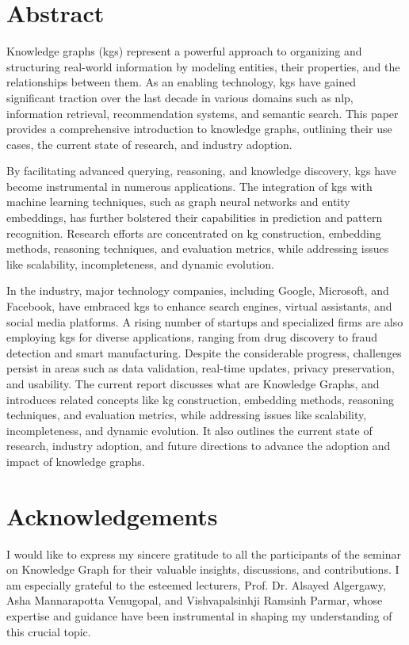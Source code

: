 \documentclass[11pt]{article} %
\title{\thetitle}
\author{\theauthor}
\date{April-Mai 2023}
\begin{document}

\newpage


\section*{Abstract}
Knowledge graphs (\acrshort{kg}s) represent a powerful approach to organizing and structuring real-world information by modeling entities, their properties, and the relationships between them. As an enabling technology, \acrshort{kg}s have gained significant traction over the last decade in various domains such as \acrshort{nlp}, information retrieval, recommendation systems, and semantic search. This paper provides a comprehensive introduction to knowledge graphs, outlining their use cases, the current state of research, and industry adoption.

By facilitating advanced querying, reasoning, and knowledge discovery, \acrshort{kg}s have become instrumental in numerous applications. The integration of \acrshort{kg}s with machine learning techniques, such as graph neural networks and entity embeddings, has further bolstered their capabilities in prediction and pattern recognition. Research efforts are concentrated on \acrshort{kg} construction, embedding methods, reasoning techniques, and evaluation metrics, while addressing issues like scalability, incompleteness, and dynamic evolution.

In the industry, major technology companies, including Google, Microsoft, and Facebook, have embraced \acrshort{kg}s to enhance search engines, virtual assistants, and social media platforms. A rising number of startups and specialized firms are also employing \acrshort{kg}s for diverse applications, ranging from drug discovery to fraud detection and smart manufacturing. Despite the considerable progress, challenges persist in areas such as data validation, real-time updates, privacy preservation, and usability. The current report discusses what are Knowledge Graphs, and introduces related concepts like \acrshort{kg} construction, embedding methods, reasoning techniques, and evaluation metrics, while addressing issues like scalability, incompleteness, and dynamic evolution. It also outlines the current state of research, industry adoption, and future directions to advance the adoption and impact of knowledge graphs.

\section*{Acknowledgements}
I would like to express my sincere gratitude to all the participants of the seminar on Knowledge Graph for their valuable insights, discussions, and contributions. I am especially grateful to the esteemed lecturers, Prof. Dr. Alsayed Algergawy, Asha Mannarapotta Venugopal, and Vishvapalsinhji Ramsinh Parmar, whose expertise and guidance have been instrumental in shaping my understanding of this crucial topic. 
\end{document}

